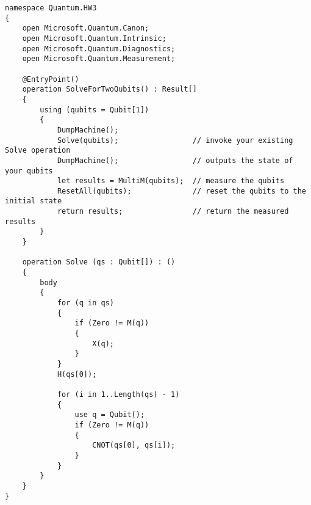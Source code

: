 \documentclass[a4paper, 12pt]{article}
\begin{document}
\begin{lstlisting}
namespace Quantum.HW3 
{   
    open Microsoft.Quantum.Canon;
    open Microsoft.Quantum.Intrinsic;
    open Microsoft.Quantum.Diagnostics;
    open Microsoft.Quantum.Measurement;
    
    @EntryPoint()
    operation SolveForTwoQubits() : Result[]
    {
        using (qubits = Qubit[1])
        {
            DumpMachine();
            Solve(qubits);                 // invoke your existing Solve operation
            DumpMachine();                 // outputs the state of your qubits
            let results = MultiM(qubits);  // measure the qubits
            ResetAll(qubits);              // reset the qubits to the initial state
            return results;                // return the measured results
        }
    } 

    operation Solve (qs : Qubit[]) : ()
    {
        body
        {
            for (q in qs)
            {
                if (Zero != M(q)) 
                {
                    X(q);
			    }
            }
            H(qs[0]);

            for (i in 1..Length(qs) - 1)
            {
                use q = Qubit();
                if (Zero != M(q))
                {
                    CNOT(qs[0], qs[i]);
                }
            }
	    }                
    }  
}
\end{lstlisting}
\end{document}
